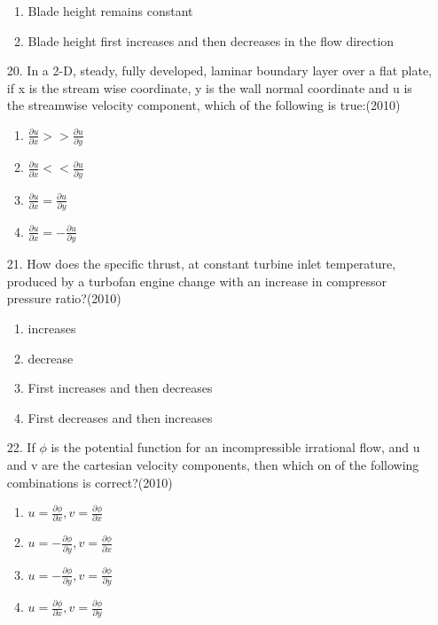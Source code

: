 \documentclass[journal]{IEEEtran}
\begin{document}
\begin{enumerate}
\begin{enumerate}[label=(\Alph*)]
    \item Blade height remains constant
    \item Blade height first increases and then decreases in the flow direction
 \end{enumerate}
 \item[20.] In a 2-D, steady, fully developed, laminar boundary layer over a flat plate, if x is the stream wise coordinate, y is the wall normal coordinate and u is the streamwise velocity component, which of the following is true:\hfill (2010)
 \begin{enumerate}[label=(\Alph*)]
    \item $\frac{\partial u}{\partial x}>>\frac{\partial u}{\partial y}$
    \item $\frac{\partial u}{\partial x}<<\frac{\partial u}{\partial y}$
    \item $\frac{\partial u}{\partial x}=\frac{\partial u}{\partial y}$
    \item $\frac{\partial u}{\partial x}=-\frac{\partial u}{\partial y}$
 \end{enumerate}
 \item[21.] How does the specific thrust, at constant turbine inlet temperature, produced by a turbofan engine change with an increase in compressor pressure ratio?\hfill (2010)
 \begin{enumerate}[label=(\Alph*)]
    \item increases
    \item decrease
    \item First increases and then decreases
    \item First decreases and then increases
 \end{enumerate}
 \item[22.] If $\phi$ is the potential function for an incompressible irrational flow, and u and v are the cartesian velocity components, then which on of the following combinations is correct?\hfill (2010)
 \begin{enumerate}[label=(\Alph*)]
    \item $u=\frac{\partial \phi}{\partial x}, v=\frac{\partial \phi}{\partial x}$
    \item $u=- \frac{\partial \phi}{\partial y}, v=\frac{\partial \phi}{\partial x}$
    \item $u=- \frac{\partial \phi}{\partial y}, v=\frac{\partial \phi}{\partial y}$
    \item $u=\frac{\partial \phi}{\partial x}, v=\frac{\partial \phi}{\partial y}$
 \end{enumerate}

\end{enumerate}
\end{document}
